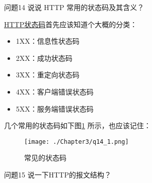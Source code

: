 \documentclass[cn,11pt,color=blue,lang=cn]{elegantbook}
\begin{document}
\begin{custom}{问题14}
说说 HTTP 常用的状态码及其含义？
\end{custom}
\begin{solution}
\href{https://www.runoob.com/http/http-status-codes.html}{HTTP状态码}首先应该知道个大概的分类：
\begin{itemize}
	\item 1XX：信息性状态码
	\item 2XX：成功状态码
	\item 3XX：重定向状态码
	\item 4XX：客户端错误状态码
	\item 5XX：服务端错误状态码
\end{itemize}
几个常用的状态码如下图\ref{fig14_1} 所示，也应该记住：
\begin{figure}[htbp]
\centering
\texttt{[image: ./Chapter3/q14\_1.png]}
\caption{常见的状态码}
\label{fig14_1}
\end{figure}
\end{solution}

\begin{custom}{问题15}
说一下HTTP的报文结构？
\end{custom}
\end{document}
